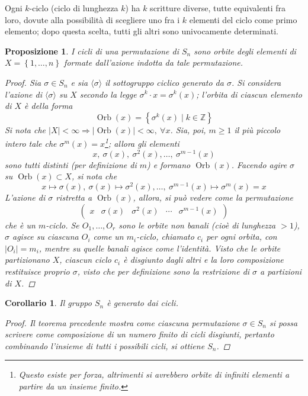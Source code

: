 \documentclass[12pt]{scrartcl}
\theoremstyle{style}
\newtheorem{prop}{Proposizione}[section]
\newtheorem{corollario}{Corollario}[teorema]
\numberwithin{equation}{subsection}
\begin{document}
Ogni $k$-ciclo (ciclo di lunghezza $k$) ha $k$ scritture diverse, tutte equivalenti fra loro, dovute alla possibilit\`a di scegliere uno fra i $k$ elementi del ciclo come primo elemento; dopo questa scelta, tutti gli altri sono univocamente determinati.
\begin{prop}
	I cicli di una permutazione di $S_n$ sono orbite degli elementi di $X = \left\{ 1,\ldots,n \right\} $ formate dall'azione indotta da tale permutazione.
	\begin{proof}
		Sia $\sigma \in S_n$ e sia $\langle \sigma  \rangle$ il sottogruppo ciclico generato da $\sigma $.
		Si considera l'azione di $\langle \sigma  \rangle$ su $X$ secondo la legge $\sigma ^k \cdot x = \sigma ^k (x)$; l'orbita di ciascun elemento di $X$ \`e della forma
		\[
		\operatorname{Orb} (x) = \left\{ \sigma ^k(x)  \mid  k \in \mathbb{Z} \right\} 
		\] 
		Si nota che $\lvert X \rvert < \infty \Rightarrow  \lvert \operatorname{Orb} (x) \rvert < \infty, \ \forall x$. 
		Sia, poi, $m\ge 1$ il pi\`u piccolo intero tale che $\sigma ^m(x) = x$\footnote{Questo esiste per forza, altrimenti si avrebbero orbite di infiniti elementi a partire da un insieme finito.}; allora gli elementi 
		\[
		x, \ \sigma (x) , \ \sigma ^2 (x) , \ldots,\ \sigma ^{m-1} (x)
		\] 
		sono tutti distinti (per definizione di $m$) e formano $\operatorname{Orb} (x)$.
		Facendo agire $\sigma $ su $\operatorname{Orb} (x) \subset X$, si nota che 
		\[
		x \mapsto \sigma (x) , \ \sigma (x) \mapsto \sigma ^2(x) ,\ldots, \ \sigma ^{m-1} (x) \mapsto \sigma ^m(x) = x
		\] 
		L'azione di $\sigma $ ristretta a $\operatorname{Orb} (x)$, allora, si pu\`o vedere come la permutazione
		\[
			\begin{pmatrix} x & \sigma (x) & \sigma ^2 (x) & \cdots & \sigma ^{m-1} (x)\end{pmatrix} 
		\] 
		che \`e un $m$-ciclo. Se $O_1,\ldots,O_r$ sono le orbite non banali (cio\`e di lunghezza $>1$), $\sigma $ agisce su ciascuna $O_i$ come un $m_i$-ciclo, chiamato $c_i$ per ogni orbita, con $\lvert O_i \rvert = m_i$, mentre su quelle banali agisce come l'identit\`a.
Visto che le orbite partizionano $X$, ciascun ciclo $c_i$ \`e disgiunto dagli altri e la loro composizione restituisce proprio $\sigma $, visto che per definizione sono la restrizione di $\sigma $ a partizioni di $X$.
	\end{proof}
\end{prop}
\begin{corollario}\label{sncic}
	Il gruppo $S_n$ \`e generato dai cicli.
	\begin{proof}
		Il teorema precedente mostra come ciascuna permutazione $\sigma \in S_n$ si possa scrivere come composizione di un numero finito di cicli disgiunti, pertanto combinando l'insieme di tutti i possibili cicli, si ottiene $S_n$.
	\end{proof}
\end{corollario}
\end{document}
